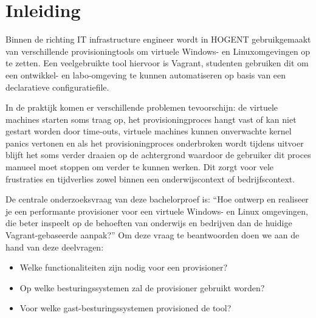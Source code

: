 


% 

\section{Inleiding}%
\label{sec:inleiding}

Binnen de richting IT infrastructure engineer wordt in HOGENT gebruikgemaakt van verschillende provisioningtools om virtuele Windows- en Linuxomgevingen op te zetten. Een veelgebruikte tool hiervoor is Vagrant, studenten gebruiken dit om een ontwikkel- en labo-omgeving te kunnen automatiseren op basis van een declaratieve configuratiefile.

In de praktijk komen er verschillende problemen tevoorschijn: de virtuele machines starten soms traag op, het provisioningproces hangt vast of kan niet gestart worden door time-outs, virtuele machines kunnen onverwachte kernel panics vertonen en als het provisioningproces onderbroken wordt tijdens uitvoer blijft het soms verder draaien op de achtergrond waardoor de gebruiker dit proces manueel moet stoppen om verder te kunnen werken. Dit zorgt voor vele frustraties en tijdverlies zowel binnen een onderwijscontext of bedrijfscontext. 

De centrale onderzoeksvraag van deze bachelorproef is: ``Hoe ontwerp en realiseer je een performante provisioner voor een virtuele Windows- en Linux omgevingen, die beter inspeelt op de behoeften van onderwijs en bedrijven dan de huidige Vagrant-gebaseerde aanpak?'' Om deze vraag te beantwoorden doen we aan de hand van deze deelvragen:
\begin{itemize}
  \item Welke functionaliteiten zijn nodig voor een provisioner?
  \item Op welke besturingssystemen zal de provisioner gebruikt worden?
  \item Voor welke gast-besturingssystemen provisioned de tool?
\end{itemize}

